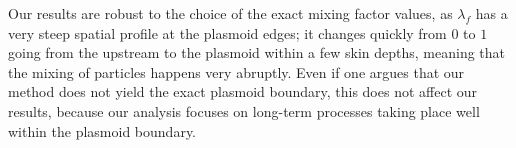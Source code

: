 Our results are robust to the choice of the exact mixing factor values, as $\lambda_f$ has a very steep spatial profile at the plasmoid edges; it changes quickly from $0$ to $1$ going from the upstream to the plasmoid within a few skin depths, meaning that the mixing of particles happens very abruptly. Even if one argues that our method does not yield the exact plasmoid boundary, this does not affect our results, because our analysis focuses on long-term processes taking place well within the plasmoid boundary.
